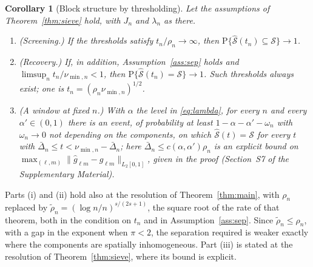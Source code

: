 \documentclass[12pt]{article} %
\newtheorem{corollary}{Corollary}
\theoremstyle{definition}
\newcommand{\Prob}{\mathrm{P}}
\newcommand{\cv}{\ell}
\newcommand{\md}{m}
\newcommand{\gcomp}[2]{g_{#1#2}}
\newcommand{\penn}{\lambda_{n}}
\begin{document}
{\begin{corollary}[Block structure by thresholding]
\label{cor:threshold}
Let the assumptions of Theorem~\ref{thm:sieve} hold, with $J_n$ and $\penn$ as
there.
\begin{enumerate}
\item[(i)] (Screening.) If the thresholds satisfy $t_n/\rho_n \to \infty$,
then $\Prob\{\widehat{\mathcal{S}}(t_n) \subseteq \mathcal{S}\} \to 1$.
\item[(ii)] (Recovery.) If, in addition, Assumption~\ref{ass:sep} holds and
$\limsup_n t_n/\nu_{\min,n} < 1$, then $\Prob\{\widehat{\mathcal{S}}(t_n) = \mathcal{S}\} \to 1$.
Such thresholds always exist; one is $t_n = (\rho_n\nu_{\min,n})^{1/2}$.
\item[(iii)] \textcolor{colR1}{(A window at fixed $n$.) With $\alpha$ the level in
\eqref{eq:lambda}, for every $n$ and every $\alpha' \in (0,1)$ there is an
event, of probability at least
$1 - \alpha - \alpha' - \omega_n$ with $\omega_n \to 0$ not depending on the
components, on which $\widehat{\mathcal{S}}(t) = \mathcal{S}$ for every $t$
with $\bar{\Delta}_n \le t < \nu_{\min,n} - \bar{\Delta}_n$; here
$\bar{\Delta}_n \le c(\alpha,\alpha')\rho_n$ is an explicit bound on
$\max_{(\cv,\md)}\lVert \widehat{g}_{\cv\md} - \gcomp{\cv}{\md}
\rVert_{L_2[0,1]}$, given in the proof (Section~S7 of the Supplementary
Material).}
\end{enumerate}
\end{corollary}

\textcolor{colR1}{Parts (i) and (ii) hold also at the resolution of
Theorem~\ref{thm:main}, with $\rho_n$ replaced by
$\tilde\rho_n = (\log n/n)^{s/(2s+1)}$, the square root of the rate of that
theorem, both in the condition on $t_n$ and in Assumption~\ref{ass:sep}.
Since $\tilde\rho_n \le \rho_n$, with a gap in the exponent when $\pi < 2$,
the separation required is weaker exactly where the components are spatially
inhomogeneous. Part (iii) is stated at the resolution of
Theorem~\ref{thm:sieve}, where its bound is explicit.}

}
\end{document}
